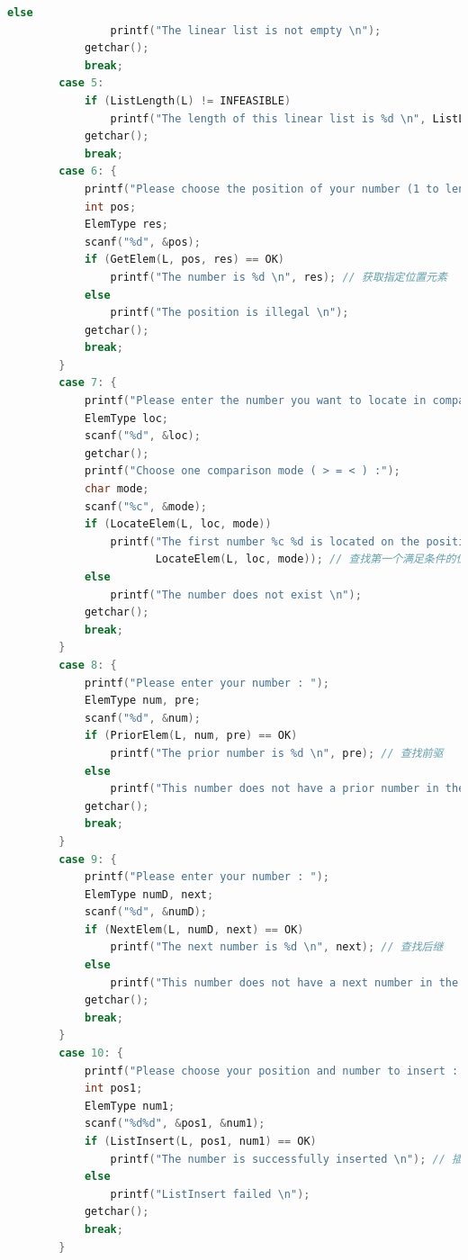 \documentclass[supercite]{Experimental_Report}
\theoremstyle{definition}
\begin{document}
\begin{lstlisting}[language=c]
            else
                printf("The linear list is not empty \n");
            getchar();
            break;
        case 5:
            if (ListLength(L) != INFEASIBLE)
                printf("The length of this linear list is %d \n", ListLength(L)); // 输出链表长度
            getchar();
            break;
        case 6: {
            printf("Please choose the position of your number (1 to length) : ");
            int pos;
            ElemType res;
            scanf("%d", &pos);
            if (GetElem(L, pos, res) == OK)
                printf("The number is %d \n", res); // 获取指定位置元素
            else
                printf("The position is illegal \n");
            getchar();
            break;
        }
        case 7: {
            printf("Please enter the number you want to locate in comparison : ");
            ElemType loc;
            scanf("%d", &loc);
            getchar();
            printf("Choose one comparison mode ( > = < ) :");
            char mode;
            scanf("%c", &mode);
            if (LocateElem(L, loc, mode))
                printf("The first number %c %d is located on the position of %d \n", mode, loc,
                       LocateElem(L, loc, mode)); // 查找第一个满足条件的位置
            else
                printf("The number does not exist \n");
            getchar();
            break;
        }
        case 8: {
            printf("Please enter your number : ");
            ElemType num, pre;
            scanf("%d", &num);
            if (PriorElem(L, num, pre) == OK)
                printf("The prior number is %d \n", pre); // 查找前驱
            else
                printf("This number does not have a prior number in the list \n");
            getchar();
            break;
        }
        case 9: {
            printf("Please enter your number : ");
            ElemType numD, next;
            scanf("%d", &numD);
            if (NextElem(L, numD, next) == OK)
                printf("The next number is %d \n", next); // 查找后继
            else
                printf("This number does not have a next number in the list \n");
            getchar();
            break;
        }
        case 10: {
            printf("Please choose your position and number to insert : ");
            int pos1;
            ElemType num1;
            scanf("%d%d", &pos1, &num1);
            if (ListInsert(L, pos1, num1) == OK)
                printf("The number is successfully inserted \n"); // 插入元素
            else
                printf("ListInsert failed \n");
            getchar();
            break;
        }

\end{lstlisting}
\end{document}
